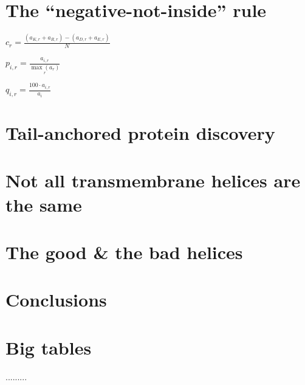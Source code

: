 \documentclass[12pt,PhD,twoside]{muthesis}
\begin{document}
\chapter{The ``negative-not-inside'' rule}


${ c }_{ r }=\frac { { ({ { a }_{ K,r } }+{ { a }_{ R,r } }) }{ - }{ ({ { a }_{ D,r } }+{ { a }_{ E,r } }) } }{ N } $

$p_{i,r} =\frac {a_{ i,r }}{ \underset {r}{\max{(a_r)}}} $

${ q }_{ i,r }=\frac { { 100·a }_{ i,r } }{ { a }_{ i } } $

\chapter{Tail-anchored protein discovery}

\chapter{Not all transmembrane helices are the same}

\chapter{The good \& the bad helices}

\chapter{Conclusions}

\printbibliography[title={Bibliography}]

\appendix
\chapter{Big tables}
.........
\end{document}
